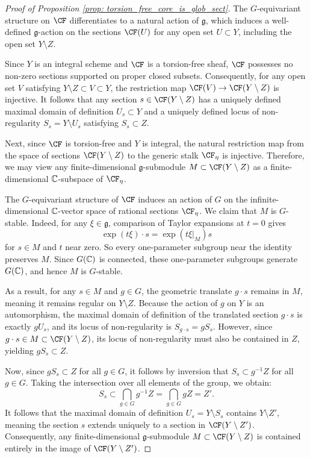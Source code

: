 \documentclass[11pt,reqno]{amsart}
\begin{document}
\begin{proof}[Proof of Proposition \ref{prop: torsion_free_core_is_glob_sect}]
    The $G$-equivariant structure on $\CF$ differentiates to a natural action of $\mathfrak{g}$, which induces a well-defined $\mathfrak{g}$-action on the sections $\CF(U)$ for any open set $U \subset Y$, including the open set $Y \setminus Z$.

    Since $Y$ is an integral scheme and $\CF$ is a torsion-free sheaf, $\CF$ possesses no non-zero sections supported on proper closed subsets. Consequently, for any open set $V$ satisfying $Y \setminus Z \subset V \subset Y$, the restriction map $\CF(V) \to \CF(Y \setminus Z)$ is injective. It follows that any section $s \in \CF(Y \setminus Z)$ has a uniquely defined maximal domain of definition $U_s \subset Y$ and a uniquely defined locus of non-regularity $S_s = Y \setminus U_s$ satisfying $S_s \subset Z$.

    Next, since $\CF$ is torsion-free and $Y$ is integral, the natural restriction map from the space of sections $\CF(Y \setminus Z)$ to the generic stalk $\CF_\eta$ is injective. Therefore, we may view any finite-dimensional $\mathfrak{g}$-submodule $M \subset \CF(Y \setminus Z)$ as a finite-dimensional $\mathbb C$-subspace of $\CF_\eta$. 
    
    The $G$-equivariant structure of $\CF$ induces an action of $G$ on the infinite-dimensional $\mathbb C$-vector space of rational sections $\CF_\eta$. We claim that $M$ is $G$-stable. Indeed, for any $\xi\in \mathfrak{g}$, comparison of Taylor expansions at $t=0$ gives \[\exp(t\xi)\cdot s = \exp(t\xi\rvert_M)s\] for $s\in M$ and $t$ near zero. So every one-parameter subgroup near the identity preserves $M$. Since $G(\mathbb C)$ is connected, these one-parameter subgroups generate $G(\mathbb C)$, and hence $M$ is $G$-stable.
    
    As a result, for any $s \in M$ and $g \in G$, the geometric translate $g \cdot s$ remains in $M$, meaning it remains regular on $Y \setminus Z$. Because the action of $g$ on $Y$ is an automorphism, the maximal domain of definition of the translated section $g \cdot s$ is exactly $g U_s$, and its locus of non-regularity is $S_{g \cdot s} = g S_s$. However, since $g \cdot s \in M \subset \CF(Y \setminus Z)$, its locus of non-regularity must also be contained in $Z$, yielding $g S_s \subset Z$.

    Now, since $g S_s \subset Z$ for all $g \in G$, it follows by inversion that $S_s \subset g^{-1}Z$ for all $g \in G$. Taking the intersection over all elements of the group, we obtain:
    \[
        S_s \subset \bigcap_{g \in G} g^{-1}Z = \bigcap_{g \in G} gZ = Z'.
    \]
    It follows that the maximal domain of definition $U_s = Y \setminus S_s$ contains $Y \setminus Z'$, meaning the section $s$ extends uniquely to a section in $\CF(Y \setminus Z')$. Consequently, any finite-dimensional $\mathfrak{g}$-submodule $M \subset \CF(Y \setminus Z)$ is contained entirely in the image of $\CF(Y \setminus Z')$. 


\end{proof}
\end{document}

